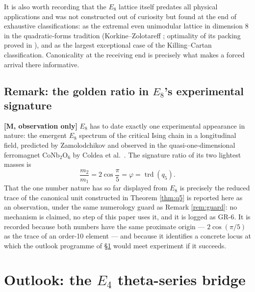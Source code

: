 \documentclass[11pt,a4paper]{article}
\theoremstyle{plain}
\theoremstyle{definition}
\theoremstyle{remark}
\newcommand{\rtag}[1]{\textnormal{\textbf{[#1]}}}
\DeclareMathOperator{\trd}{trd}
\begin{document}
It is also worth recording that the $E_8$ lattice itself predates all physical applications and was not constructed out of curiosity but found at the end of exhaustive classifications: as the extremal even unimodular lattice in dimension 8 in the quadratic-forms tradition (Korkine--Zolotareff \cite{KZ}; optimality of its packing proved in \cite{Viazovska}), and as the largest exceptional case of the Killing--Cartan classification. Canonicality at the receiving end is precisely what makes a forced arrival there informative.

\subsection{Remark: the golden ratio in $E_8$'s experimental signature}\label{sec:coldea}

\rtag{M, observation only} $E_8$ has to date exactly one experimental appearance in nature: the emergent $E_8$ spectrum of the critical Ising chain in a longitudinal field, predicted by Zamolodchikov \cite{Zamolodchikov} and observed in the quasi-one-dimensional ferromagnet $\mathrm{CoNb_2O_6}$ by Coldea et al.\ \cite{Coldea}. The signature ratio of its two lightest masses is
\begin{equation}
\frac{m_2}{m_1} = 2\cos\frac{\pi}{5} = \varphi = \trd(q_5).
\end{equation}
That the one number nature has so far displayed from $E_8$ is precisely the reduced trace of the canonical unit constructed in Theorem \ref{thm:q5} is reported here as an observation, under the same numerology guard as Remark \ref{rem:guard}: no mechanism is claimed, no step of this paper uses it, and it is logged as GR-6. It is recorded because both numbers have the same proximate origin --- $2\cos(\pi/5)$ as the trace of an order-10 element --- and because it identifies a concrete locus at which the outlook programme of \S\ref{sec:outlook} would meet experiment if it succeeds.

\section{Outlook: the $E_4$ theta-series bridge}\label{sec:outlook}
\end{document}
